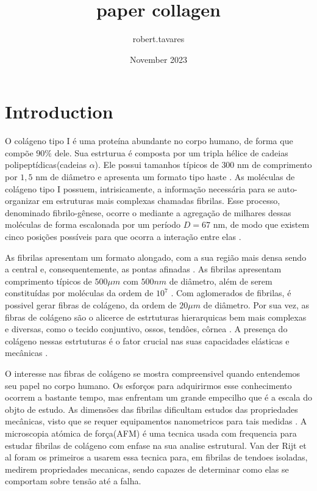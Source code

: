 \documentclass{article}
\title{paper collagen}
\author{robert.tavares}
\date{November 2023}
\begin{document}
\maketitle

\section{Introduction}

    O colágeno tipo I é uma proteína abundante no corpo humano, de forma que compõe $90\%$ dele. Sua estrturua é 
    composta por um tripla hélice de cadeias polipeptídicas(cadeias $\alpha$). Ele possui tamanhos típicos de $300$ nm de 
    comprimento por $1,5$ nm de diâmetro e apresenta um formato tipo haste \cite{Gelse2003,Silver2018}. As moléculas de 
    colágeno tipo I possuem, intrisicamente, a informação necessária para se auto-organizar em estruturas mais complexas 
    chamadas fibrilas. Esse processo, denominado fibrilo-gênese, ocorre o mediante a agregação de milhares dessas moléculas de forma 
    escalonada por um período $D= 67$ nm, de modo que existem cinco posições possíveis para que ocorra a interação entre 
    elas \cite{Zhu2018, KADLER1996}.  
    
    As fibrilas apresentam um formato alongado, com a sua região mais densa sendo a central e, consequentemente, as pontas 
    afinadas \cite{Charvolin2019, KADLER1996}. As fibrilas apresentam comprimento típicos de $500 \mu m$ com $500 nm$ de 
    diâmetro, além de serem constituídas por moléculas da ordem de $10^{7}$ \cite{Parry1984}. Com aglomerados de fibrilas, 
    é possivel gerar fibras de colágeno, da ordem de $20 \mu m$ de diâmetro. Por sua vez, as fibras de colágeno são 
    o alicerce de estrtuturas hierarquicas bem mais complexas e diversas, como o tecido conjuntivo, ossos, tendôes, côrnea 
    \cite{RicoLlanos2021}. A presença do colágeno nessas estrtuturas é o fator crucial nas suas capacidades 
    elásticas e mecânicas \cite{Silver2018}.

    O interesse nas fibras de colágeno se mostra compreensivel quando entendemos seu papel no corpo humano. Os esforços para
    adquirirmos esse conhecimento ocorrem a bastante tempo, mas enfrentam um grande empecilho que é a escala do objto de estudo.
    As dimensões das fibrilas dificultam estudos das propriedades mecânicas, visto que se requer equipamentos nanometricos para
    tais medidas \cite{Nalbach2022InstrumentFT}. A microscopia atómica de força(AFM) é uma tecnica usada com frequencia para 
    estudar fibrilas de colágeno \cite{Andriotis2015-lx,Mull2022-br} com enfase na sua analise estrutural. Van der Rijt et al
    \cite{Rijt} foram os primeiros a usarem essa tecnica para, em fibrilas de tendoes isoladas, medirem propriedades mecanicas,
    sendo capazes de determinar como elas se comportam sobre tensão até a falha.
\end{document}
